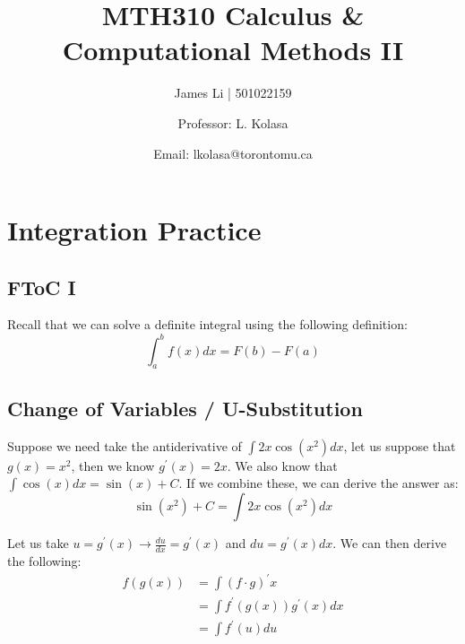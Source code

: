 \documentclass[a4paper]{article}
\title{MTH310 Calculus \& Computational Methods II}
\author{James Li | 501022159 \and Professor: L. Kolasa\and Email: lkolasa@torontomu.ca}
\date{}
\begin{document}
  \maketitle
  \tableofcontents
  \newpage
  \section{Integration Practice} 
  \subsection{FToC I} 
  Recall that we can solve a definite integral using the following definition:
  $$
    \displaystyle\int_{a }^{b} f(x)dx = F(b) - F(a)
  $$ 
  \subsection{Change of Variables / U-Substitution}
  Suppose we need take the antiderivative of $\int 2x \cos(x^2)dx$, let us suppose that $g(x) = x^2$, then we know $g^\prime (x) = 2x$. We also know that $\int \cos (x) dx = \sin(x) + C$. If we combine these, we can derive the answer as:
  $$
  \sin (x^2) + C = \int 2x \cos(x^2)dx
  $$
  \begin{theorem}
    Let us take $u = g^\prime (x) \rightarrow \frac{du }{dx } = g^\prime (x)$ and $du = g^\prime (x) dx$. We can then derive the following:
      \begin{equation}
        \label{Usub}
        \begin{split}
          f(g(x)) &= \int (f \cdot g)^\prime x \\
                  &= \int f^\prime (g(x)) g^\prime(x) dx \\
                  &= \int f^\prime (u) du
        \end{split}
      \end{equation}
  \end{theorem}
\end{document}
